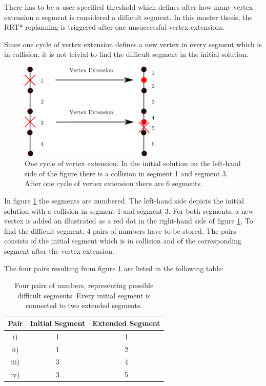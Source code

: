 There has to be a user specified threshold which defines after how many vertex extension a segment is considered a difficult segment. In this master thesis, the RRT* replanning is triggered after one unsuccessful vertex extensions.\newline

Since one cycle of vertex extension defines a new vertex in every segment which is in collision, it is not trivial to find the difficult segment in the initial solution.

\begin{figure}[H]
   \centering
   \includegraphics[width=0.6\textwidth]{pics/recogniseSegment.eps}
   \caption{One cycle of vertex extension. In the initial solution on the left-hand side of the figure there is a collision in segment 1 and segment 3. After one cycle of vertex extension there are 6 segments. }
   \label{pic:recognise}
\end{figure}

In figure \ref{pic:recognise} the segments are numbered. The left-hand side depicts the initial solution with a collision in segment 1 and segment 3. For both segments, a new vertex is added an illustrated as a red dot in the right-hand side of figure \ref{pic:recognise}. To find the difficult segment, 4 pairs of numbers have to be stored. The pairs consists of the initial segment which is in collision and of the corresponding segment after the vertex extension. \newline

The four pairs resulting from figure \ref{pic:recognise} are listed in the following table:

\begin{table}[H] 
\begin{center}
    \begin{tabular}{| c | c | c | }
    \hline
    Pair & Initial Segment & Extended Segment\\ \hline
   i) & 1 & 1 \\ \hline
   ii) & 1 & 2\\ \hline
   iii) & 3 & 4\\ \hline
   iv) & 3 & 5\\
    \hline
    \end{tabular}
    \caption{Four pairs of numbers, representing possible difficult segments. Every initial segment is connected to two extended segments.}
    \label{tab:pairsOfNumbers}
\end{center}
\end{table}

